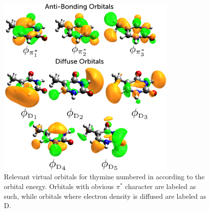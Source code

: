 \documentclass[12pt]{article}
\begin{document}
\begin{figure}[!b]
\centering
\includegraphics[width=8.8cm]{figure_6.png}
\caption{Relevant virtual orbitals for thymine numbered in according to the orbital energy. Orbitals with obvious $\pi^*$ character are labeled as such, while orbitals where electron density is diffused  are labeled as D.}
\label{fig:thyminevirtuals}
\end{figure}
\end{document}
